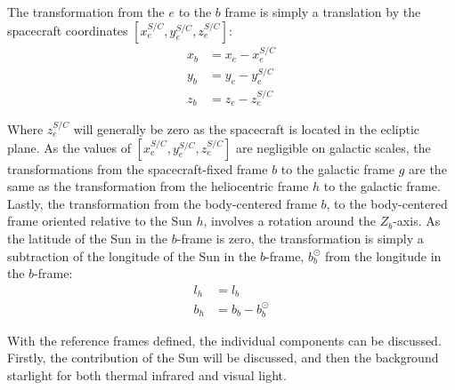 The transformation from the $e$ to the $b$ frame is simply a translation by the spacecraft coordinates $[x_e^{S/C}, y_e^{S/C}, z_e^{S/C}]$:
\begin{align}
 x_b &= x_e - x_e^{S/C} \\
 y_b &= y_e - y_e^{S/C} \\
 z_b &= z_e - z_e^{S/C}
\end{align}

Where $z_e^{S/C}$ will generally be zero as the spacecraft is located in the ecliptic plane. As the values of $[x_e^{S/C}, y_e^{S/C}, z_e^{S/C}]$ are negligible on galactic scales, the transformations from the spacecraft-fixed frame $b$ to the galactic frame $g$ are the same as the transformation from the heliocentric frame $h$ to the galactic frame. Lastly, the transformation from the body-centered frame $b$, to the body-centered frame oriented relative to the Sun $h$, involves a rotation around the $Z_b$-axis. As the latitude of the Sun in the $b$-frame is zero, the transformation is simply a subtraction of the longitude of the Sun in the $b$-frame, $b_b^{\odot}$ from the longitude in the $b$-frame:
\begin{align}
 l_h &= l_b \\
 b_h &= b_b - b_b^{\odot}
\end{align}

With the reference frames defined, the individual components can be discussed. Firstly, the contribution of the Sun will be discussed, and then the background starlight for both thermal infrared and visual light.

